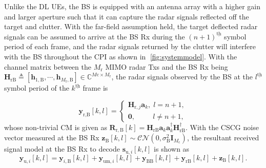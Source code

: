 \documentclass[9pt,journal]{IEEEtran}
\newcommand{\paren}[1]{\left({#1}\right)}
\newcommand{\bracket}[1]{{\left [{#1}\right ]}}
\newcommand{\ith}[1]    {{#1}^{\underline{\text{th}}}}
\newcommand{\rr}{_\mathrm{r}}
\newcommand{\cc}{_\mathrm{c}}
\newcommand{\B}{\textrm{B}}
\begin{document}
	
Unlike the DL UEs, the BS is equipped with an antenna array with a higher gain and larger aperture such that it can capture the radar signals reflected off the target and clutter. With the far-field assumption held, the target deflected radar signals can be assumed to arrive at the BS Rx during the $\ith{\paren{n+1}}$ symbol period of each frame, and the radar signals returned by the clutter will interfere with the BS throughout the CPI as shown in \figurename{$\;$\ref{fig:systemmodel}}. With the channel matrix between the $\mathit{M}\rr$ MIMO radar Txs and the BS Rx being $\mathbf{H}_{\textrm{rB}}\triangleq\bracket{\mathbf{h}_{1,\textrm{B}},\cdots,\mathbf{h}_{\mathit{M}\rr,\textrm{B}}}\in\mathbb{C}^{\mathit{M}\mathrm{c}\times \mathit{M}\rr}$, the radar signals observed by the BS at the $\ith{l}$ symbol period of the $\ith{k}$ frame is\par\noindent\small
\begin{equation*}
    \mathbf{y}_{\textrm{r,B}}\bracket{k,l}=
    \begin{cases}
    \mathbf{H}_{\mathrm{r},j}\mathbf{a}_k, \;l=n+1,\\
    \mathbf{0}, \qquad~~ l\neq n+1,
    \end{cases}
\end{equation*}
\normalsize
whose non-trivial CM is given as $\mathbf{R}_{\mathrm{r,B}}\bracket{k}=\mathbf{H}_{\textrm{rB}}\mathbf{a}_k\mathbf{a}^\dagger_k\mathbf{H}^\dagger_{\textrm{rB}}$. With the CSCG noise vector measured at the BS Rx $\mathbf{z}_\textrm{B}\bracket{k,l}\sim\mathcal{CN}\paren{0,\sigma^2_{\textrm{B}}\mathbf{I}_{M\cc}}$, the resultant received signal model at the BS Rx to decode $\mathbf{s}_{\textrm{u},i}\bracket{k,l}$ is shown as 
\begin{equation*}
    \mathbf{y}_{\textrm{u},i}\bracket{k,l}=\mathbf{y}_{i,\B}\bracket{k,l}+\mathbf{y}_{\textrm{um},i}\bracket{k,l}+\mathbf{y}_{\textrm{BB}}\bracket{k,l}+\mathbf{y}_{\textrm{rB}}\bracket{k,l}+\mathbf{z}_\textrm{B}\bracket{k,l}.
\end{equation*}
\end{document}
